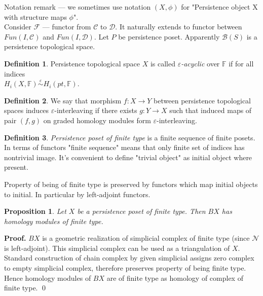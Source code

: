 \documentclass[a4paper, 12pt]{article}
\newtheorem{proposition}{Proposition}
\theoremstyle{definition}
\newtheorem{definition}{Definition}
\theoremstyle{remark}
\newenvironment{pf}{\noindent\textbf{Proof.}}{\qed}
\newcommand{\define}[1]{{\textit{#1}}}
\begin{document}
Notation remark --- we sometimes use notation $(X,\phi)$ for "Persistence object X with structure maps $\phi$".\\

Consider $\mathcal{F}$ --- functor from $\mathcal{C}$ to $\mathcal{D}$. It naturally extends to functor between $Fun(I,\mathcal{C})$ and $Fun(I,\mathcal{D})$. Let $P$ be persistence poset.  Apparently $\mathcal{B}(S)$ is a persistence topological space.\\

\begin{definition}
  Persistence topological space $X$ is called \define{$\varepsilon$-acyclic} over $\mathbb{F}$ if for all indices\\ $H_i(X,\mathbb{F}) \stackrel{\varepsilon}{\sim} H_i(pt,\mathbb{F})$.
\end{definition}

\begin{definition}
  We say that morphism $f : X \to Y$ between persistence topological spaces induces $\varepsilon$-interleaving if there exists $g : Y \to X$ such that induced maps of pair $(f,g)$ on graded homology modules form $\varepsilon$-interleaving.
\end{definition}

\begin{definition}
  \define{Persistence poset of finite type} is a finite sequence of finite posets.\\

  In terms of functors "finite sequence" means that only finite set of indices has nontrivial image. It's convenient to define "trivial object" as initial object where present.
\end{definition}

Property of being of finite type is preserved by functors which map initial objects to initial. In particular by left-adjoint functors.\\

\begin{proposition}
  Let $X$ be a persistence poset of finite type. Then $BX$ has homology modules of finite type.
\end{proposition}

\begin{pf}
  $BX$ is a geometric realization of simplicial complex of finite type (since $\mathcal{N}$ is left-adjoint). This simplicial complex can be used as a triangulation of $X$. Standard construction of chain complex by given simplicial assigns zero complex to empty simplicial complex, therefore preserves property of being finite type. Hence homology modules of $BX$ are of finite type as homology of complex of finite type.
\end{pf}\\
\end{document}
